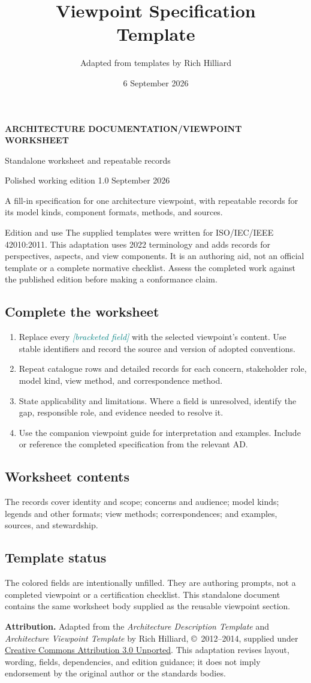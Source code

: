 \documentclass[11pt,letterpaper]{article}
\title{Viewpoint Specification\\Template}
\author{Adapted from templates by Rich Hilliard}
\date{6 September 2026}
\makeatletter
\newcommand{\TemplatePageBreak}{\clearpage}
\newcommand{\FillIn}[1]{\textcolor{Teal}{\sffamily\itshape[#1]}}
\newcommand{\Lead}[1]{\textcolor{Muted}{#1}\par\vspace{3pt}}
\newcommand{\TemplateTitle}[3]{%
  {\sffamily\small\bfseries\color{Teal}ARCHITECTURE DOCUMENTATION\enspace /\enspace #1\par}
  \vspace{14pt}
  {\sffamily\bfseries\fontsize{29}{33}\selectfont\color{Navy}#2\par}
  \vspace{10pt}
  {\sffamily\large\color{Muted}#3\par}
  \vspace{11pt}
  {\sffamily\small\color{Muted}Polished working edition 1.0\enspace\textbullet\enspace 6 September 2026\par}
  \vspace{13pt}{\color{Teal}\hrule height 1.2pt}\vspace{9pt}}
\newcommand{\TemplateAttribution}{%
  \textbf{Attribution.} Adapted from the \emph{Architecture Description Template}
  and \emph{Architecture Viewpoint Template} by Rich Hilliard,
  \copyright\ 2012--2014, supplied under
  \href{https://creativecommons.org/licenses/by/3.0/}{Creative Commons Attribution 3.0 Unported}.
  This adaptation revises layout, wording, fields, dependencies, and edition guidance;
  it does not imply endorsement by the original author or the standards bodies.}
\newcommand{\EditionNote}{%
  The supplied templates were written for ISO/IEC/IEEE 42010:2011.
  This adaptation uses 2022 terminology and adds records for perspectives,
  aspects, and view components. It is an authoring aid, not an official template
  or a complete normative checklist. Assess the completed work against the
  published edition before making a conformance claim.}
\renewcommand{\maketitle}{\TemplateTitle{VIEWPOINT WORKSHEET}{\@title}{Standalone worksheet and repeatable records}}
\makeatother
\begin{document}
\maketitle
\Lead{A fill-in specification for one architecture viewpoint, with repeatable
records for its model kinds, component formats, methods, and sources.}

\begin{TemplateNote}{Edition and use}
\EditionNote
\end{TemplateNote}

\subsection{Complete the worksheet}
\begin{enumerate}
\item Replace every \FillIn{bracketed field} with the selected viewpoint's content.
Use stable identifiers and record the source and version of adopted conventions.
\item Repeat catalogue rows and detailed records for each concern, stakeholder
role, model kind, view method, and correspondence method.
\item State applicability and limitations. Where a field is unresolved, identify
the gap, responsible role, and evidence needed to resolve it.
\item Use the companion viewpoint guide for interpretation and examples.
Include or reference the completed specification from the relevant AD.
\end{enumerate}

\subsection{Worksheet contents}
The records cover identity and scope; concerns and audience; model kinds;
legends and other formats; view methods; correspondences; and examples,
sources, and stewardship.

\subsection{Template status}
The colored fields are intentionally unfilled. They are authoring prompts,
not a completed viewpoint or a certification checklist. This standalone
document contains the same worksheet body supplied as the reusable viewpoint section.

\vfill
{\footnotesize\color{Muted}\TemplateAttribution\par}
\TemplatePageBreak
\end{document}
